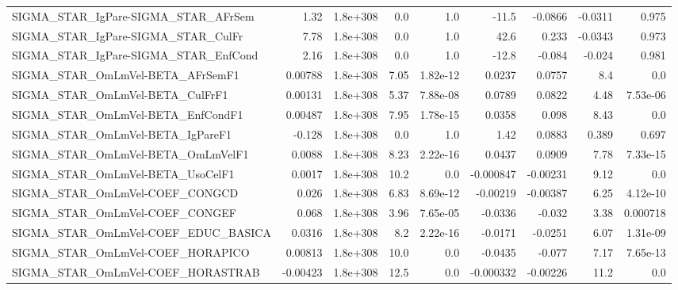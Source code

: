 \begin{tabular}{lrrrrrrrr}
SIGMA\_STAR\_IgPare-SIGMA\_STAR\_AFrSem   &        1.32 &     1.8e+308 &     0.0 &      1.0 &      -11.5 &     -0.0866 &      -0.0311 &         0.975 \\
SIGMA\_STAR\_IgPare-SIGMA\_STAR\_CulFr    &        7.78 &     1.8e+308 &     0.0 &      1.0 &       42.6 &       0.233 &      -0.0343 &         0.973 \\
SIGMA\_STAR\_IgPare-SIGMA\_STAR\_EnfCond  &        2.16 &     1.8e+308 &     0.0 &      1.0 &      -12.8 &      -0.084 &       -0.024 &         0.981 \\
SIGMA\_STAR\_OmLmVel-BETA\_AFrSemF1      &     0.00788 &     1.8e+308 &    7.05 & 1.82e-12 &     0.0237 &      0.0757 &          8.4 &           0.0 \\
SIGMA\_STAR\_OmLmVel-BETA\_CulFrF1       &     0.00131 &     1.8e+308 &    5.37 & 7.88e-08 &     0.0789 &      0.0822 &         4.48 &      7.53e-06 \\
SIGMA\_STAR\_OmLmVel-BETA\_EnfCondF1     &     0.00487 &     1.8e+308 &    7.95 & 1.78e-15 &     0.0358 &       0.098 &         8.43 &           0.0 \\
SIGMA\_STAR\_OmLmVel-BETA\_IgPareF1      &      -0.128 &     1.8e+308 &     0.0 &      1.0 &       1.42 &      0.0883 &        0.389 &         0.697 \\
SIGMA\_STAR\_OmLmVel-BETA\_OmLmVelF1     &      0.0088 &     1.8e+308 &    8.23 & 2.22e-16 &     0.0437 &      0.0909 &         7.78 &      7.33e-15 \\
SIGMA\_STAR\_OmLmVel-BETA\_UsoCelF1      &      0.0017 &     1.8e+308 &    10.2 &      0.0 &  -0.000847 &    -0.00231 &         9.12 &           0.0 \\
SIGMA\_STAR\_OmLmVel-COEF\_CONGCD        &       0.026 &     1.8e+308 &    6.83 & 8.69e-12 &   -0.00219 &    -0.00387 &         6.25 &      4.12e-10 \\
SIGMA\_STAR\_OmLmVel-COEF\_CONGEF        &       0.068 &     1.8e+308 &    3.96 & 7.65e-05 &    -0.0336 &      -0.032 &         3.38 &      0.000718 \\
SIGMA\_STAR\_OmLmVel-COEF\_EDUC\_BASICA   &      0.0316 &     1.8e+308 &     8.2 & 2.22e-16 &    -0.0171 &     -0.0251 &         6.07 &      1.31e-09 \\
SIGMA\_STAR\_OmLmVel-COEF\_HORAPICO      &     0.00813 &     1.8e+308 &    10.0 &      0.0 &    -0.0435 &      -0.077 &         7.17 &      7.65e-13 \\
SIGMA\_STAR\_OmLmVel-COEF\_HORASTRAB     &    -0.00423 &     1.8e+308 &    12.5 &      0.0 &  -0.000332 &    -0.00226 &         11.2 &           0.0 \\

\end{tabular}
